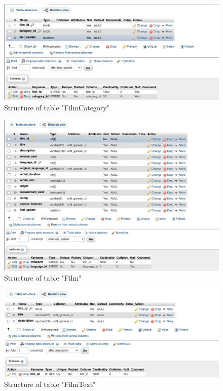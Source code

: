 \documentclass{article}
\begin{document}
	\begin{figure}[H]
		\includegraphics[width=\textwidth]{table_filmcategory_struct}
		\caption{Structure of table "Film\textunderscore Category"}	
	\end{figure}
	\begin{figure}[H]
		\includegraphics[width=\textwidth]{table_film_struct}
		\caption{Structure of table "Film"}	
	\end{figure}
	\begin{figure}[H]
		\includegraphics[width=\textwidth]{table_filmtext_struct}
		\caption{Structure of table "Film\textunderscore Text"}	
	\end{figure}
\end{document}
